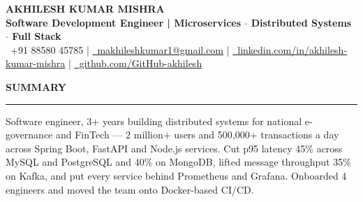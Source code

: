 \documentclass[10pt]{article}
\newcommand{\resumesection}[1]{%
  \vspace{6pt}%
  {\fontfamily{phv}\selectfont\textbf{\large\MakeUppercase{#1}}}%
  \vspace{2pt}%
  \hrule%
  \vspace{4pt}%
}
\begin{document}
\begin{center}
    {\selectfont\textbf{\Huge AKHILESH KUMAR MISHRA}} \\
    \vspace{3pt}
    {\selectfont\large\textbf{\textcolor{primaryblue}{Software Development Engineer | Microservices $\cdot$ Distributed Systems $\cdot$ Full Stack}}} \\
    \vspace{4pt}
    {\small
    \textcolor{primaryblue}{\faPhone*}~+91 88580 45785 \quad | \quad
    \href{mailto:makhileshkumar1@gmail.com}{\textcolor{primaryblue}{\faEnvelope}~makhileshkumar1@gmail.com} \quad | \quad
    \href{https://linkedin.com/in/akhilesh-kumar-mishra-a46030231}{\textcolor{primaryblue}{\faLinkedin}~linkedin.com/in/akhilesh-kumar-mishra} \quad | \quad
    \href{https://github.com/GitHub-akhilesh}{\textcolor{primaryblue}{\faGithub}~github.com/GitHub-akhilesh}
    }
\end{center}
\vspace{-10pt}

\resumesection{Summary}
Software engineer, 3+ years building distributed systems for national e-governance and FinTech --- 2 million+ users and 500,000+ transactions a day across Spring Boot, FastAPI and Node.js services. Cut p95 latency 45\% across MySQL and PostgreSQL and 40\% on MongoDB, lifted message throughput 35\% on Kafka, and put every service behind Prometheus and Grafana. Onboarded 4 engineers and moved the team onto Docker-based CI/CD.
\end{document}
